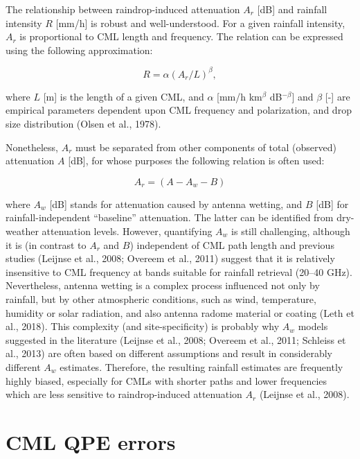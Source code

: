 \documentclass{ctuthesis}\usepackage[]{graphicx}\usepackage[]{color}
\begin{document}
The relationship between raindrop-induced attenuation $A_r$ [dB] and rainfall intensity $R$ [mm/h] is robust and well-understood. For a given rainfall intensity, $A_r$ is proportional to CML length and frequency. The relation can be expressed using the following approximation: 

\begin{equation} \label{2eq1}
R = \alpha (A_r / L)^\beta,
\end{equation}


where $L$ [m] is the length of a given CML, and $\alpha$ [mm/h km$^\beta$ dB$^{-\beta}$] and $\beta$ [-] are empirical parameters dependent upon CML frequency and polarization, and drop size distribution (Olsen et al., 1978).

Nonetheless, $A_r$ must be separated from other components of total (observed) attenuation $A$ [dB], for whose purposes the following relation is often used: 

\begin{equation} \label{2eq2}
A_r = (A - A_w - B)
\end{equation}

where $A_w$ [dB] stands for attenuation caused by antenna wetting, and $B$ [dB] for rainfall-independent \enquote{baseline} attenuation. The latter can be identified from dry-weather attenuation levels. However, quantifying $A_w$ is still challenging, although it is (in contrast to $A_r$ and $B$) independent of CML path length and previous studies (Leijnse et al., 2008; Overeem et al., 2011) suggest that it is relatively insensitive to CML frequency at bands suitable for rainfall retrieval (20--40 GHz). Nevertheless, antenna wetting is a complex process influenced not only by rainfall, but by other atmospheric conditions, such as wind, temperature, humidity or solar radiation, and also antenna radome material or coating (Leth et al., 2018). This complexity (and site-specificity) is probably why $A_w$ models suggested in the literature (Leijnse et al., 2008; Overeem et al., 2011; Schleiss et al., 2013) are often based on different assumptions and result in considerably different $A_w$ estimates. Therefore, the resulting rainfall estimates are frequently highly biased, especially for CMLs with shorter paths and lower frequencies which are less sensitive to raindrop-induced attenuation $A_r$ (Leijnse et al., 2008). 



\section{CML QPE errors}
\end{document}

